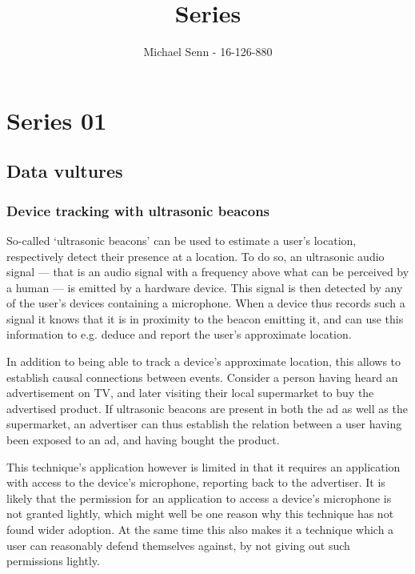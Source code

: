 \documentclass[a4paper]{scrreprt}
\title{Series \series}
\author{Michael Senn \maillink{michael.senn@students.unibe.ch} - 16-126-880}
\date{\printdate}
\newcommand{\series}{01}
\begin{document}
\maketitle


\setcounter{chapter}{\numexpr \series - 1 \relax}

\chapter{Series \series}

\section{Data vultures}

\subsection{Device tracking with ultrasonic beacons}

So-called `ultrasonic beacons' can be used to estimate a user's location,
respectively detect their presence at a location. To do so, an ultrasonic audio
signal --- that is an audio signal with a frequency above what can be perceived
by a human --- is emitted by a hardware device. This signal is then detected by
any of the user's devices containing a microphone. When a device thus records
such a signal it knows that it is in proximity to the beacon emitting it, and
can use this information to e.g. deduce and report the user's approximate
location.\autocite{newmanHowBlockUltrasonic2016}

In addition to being able to track a device's approximate location, this
allows to establish causal connections between events. Consider a person having
heard an advertisement on TV, and later visiting their local supermarket to buy
the advertised product. If ultrasonic beacons are present in both the ad as
well as the supermarket, an advertiser can thus establish the relation between
a user having been exposed to an ad, and having bought the product.
\autocite{fribergUltrasonicBeaconsSilent2017}

This technique's application however is limited in that it requires an
application with access to the device's microphone, reporting back to the
advertiser. It is likely that the permission for an application to access a
device's microphone is not granted lightly, which might well be one reason why
this technique has not found wider adoption. At the same time this also makes
it a technique which a user can reasonably defend themselves against, by not
giving out such permissions lightly.
\end{document}
